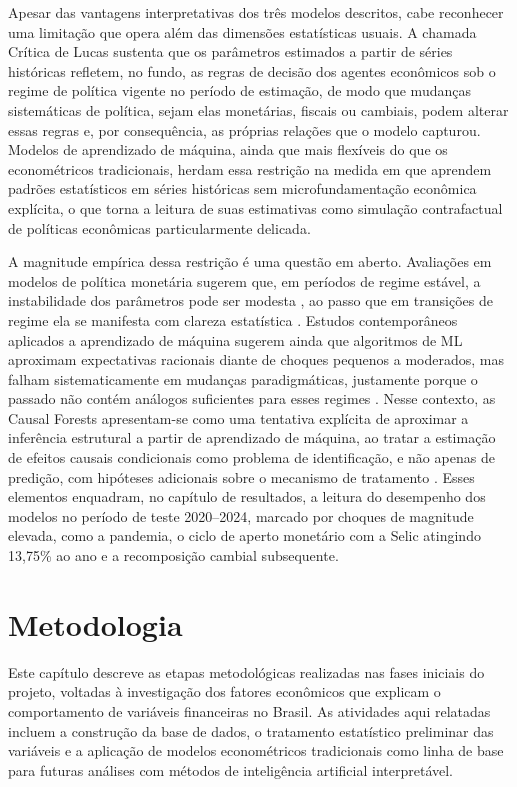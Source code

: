 \documentclass[	12pt, Times, openright, oneside, a4paper, english, brazil]{abntex2}
\begin{document}
Apesar das vantagens interpretativas dos três modelos descritos, cabe reconhecer uma limitação que opera além das dimensões estatísticas usuais. A chamada Crítica de Lucas \cite{lucas1976critique} sustenta que os parâmetros estimados a partir de séries históricas refletem, no fundo, as regras de decisão dos agentes econômicos sob o regime de política vigente no período de estimação, de modo que mudanças sistemáticas de política, sejam elas monetárias, fiscais ou cambiais, podem alterar essas regras e, por consequência, as próprias relações que o modelo capturou. Modelos de aprendizado de máquina, ainda que mais flexíveis do que os econométricos tradicionais, herdam essa restrição na medida em que aprendem padrões estatísticos em séries históricas sem microfundamentação econômica explícita, o que torna a leitura de suas estimativas como simulação contrafactual de políticas econômicas particularmente delicada.

A magnitude empírica dessa restrição é uma questão em aberto. Avaliações em modelos de política monetária sugerem que, em períodos de regime estável, a instabilidade dos parâmetros pode ser modesta \cite{rudebusch2005lucas}, ao passo que em transições de regime ela se manifesta com clareza estatística \cite{lubik2010stability}. Estudos contemporâneos aplicados a aprendizado de máquina sugerem ainda que algoritmos de ML aproximam expectativas racionais diante de choques pequenos a moderados, mas falham sistematicamente em mudanças paradigmáticas, justamente porque o passado não contém análogos suficientes para esses regimes \cite{castelnuovo2022ml}. Nesse contexto, as Causal Forests apresentam-se como uma tentativa explícita de aproximar a inferência estrutural a partir de aprendizado de máquina, ao tratar a estimação de efeitos causais condicionais como problema de identificação, e não apenas de predição, com hipóteses adicionais sobre o mecanismo de tratamento \cite{athey2019ml}. Esses elementos enquadram, no capítulo de resultados, a leitura do desempenho dos modelos no período de teste 2020--2024, marcado por choques de magnitude elevada, como a pandemia, o ciclo de aperto monetário com a Selic atingindo 13,75\% ao ano e a recomposição cambial subsequente.


\chapter{Metodologia}

Este capítulo descreve as etapas metodológicas realizadas nas fases iniciais do projeto, voltadas à investigação dos fatores econômicos que explicam o comportamento de variáveis financeiras no Brasil. As atividades aqui relatadas incluem a construção da base de dados, o tratamento estatístico preliminar das variáveis e a aplicação de modelos econométricos tradicionais como linha de base para futuras análises com métodos de inteligência artificial interpretável.
\end{document}
